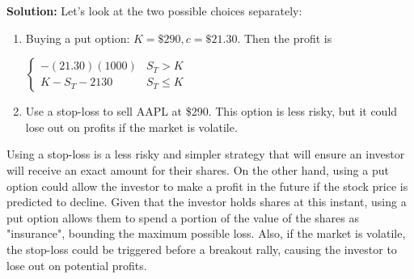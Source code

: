 \documentclass{article}
\begin{document}
\textbf{Solution:} Let's look at the two possible choices separately:
\begin{enumerate}
    \item Buying a put option: $K = \$290, c = \$21.30$. Then the profit is
    \begin{center}
        $\begin{cases}
        -(21.30)(1000) & S_T > K \\
        K - S_T - 2130 & S_T \leq K
        \end{cases}$
    \end{center}
    \item Use a stop-loss to sell AAPL at \$290. This option is less risky, but it could lose out on profits if the market is volatile.
\end{enumerate}
Using a stop-loss is a less risky and simpler strategy that will ensure an investor will receive an exact amount for their shares. On the other hand,
using a put option could allow the investor to make a profit in the future if the stock price is predicted to decline. Given that the investor holds shares
at this instant, using a put option allows them to spend a portion of the value of the shares as "insurance", bounding the maximum possible loss. Also, if the market
is volatile, the stop-loss could be triggered before a breakout rally, causing the investor to lose out on potential profits.
\end{document}
